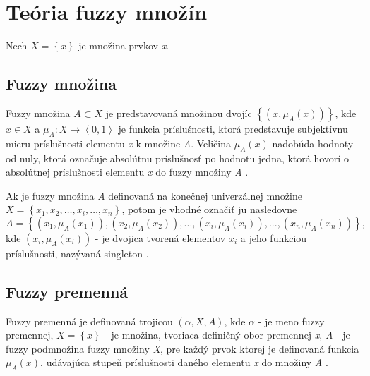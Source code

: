 
\section{Teória fuzzy množín}
Nech \textit{$ X = \left\lbrace x \right\rbrace$} je množina prvkov \textit{x}. 

\subsection*{Fuzzy množina}
\begin{defn} 
	
	Fuzzy množina \textit{$A \subset X $} je predstavovaná množinou dvojíc $ \left\lbrace \left( x, \mu_A \left( x \right) \right) \right\rbrace  $, kde $ x \in X$ a $ \mu_A : X \longrightarrow \left\langle 0, 1\right\rangle $ je funkcia príslušnosti, ktorá predstavuje subjektívnu mieru príslušnosti elementu \textit{x} k množine \textit{A}. 
	Veličina $\mu_A\left( x\right) $ nadobúda hodnoty od nuly, ktorá označuje absolútnu príslušnosť po hodnotu jedna, ktorá hovorí o absolútnej príslušnosti elementu \textit{x} do fuzzy množiny \textit{A} \cite{levashenkoProj, Zadeh1965}.\end{defn}

Ak je fuzzy množina \textit{A} definovaná na konečnej univerzálnej množine 
\\
$X = \left\lbrace x_1, x_2, \ldots , x_i, \ldots, x_n\right\rbrace $, potom je vhodné označiť ju nasledovne
$$
A = \left\lbrace 
\left( x_1, \mu_A\left( x_1\right)  \right) , 
\left( x_2, \mu_A\left( x_2\right)  \right) , ... , 
\left( x_i, \mu_A\left( x_i\right)  \right) , ... , 
\left( x_n, \mu_A\left( x_n\right)  \right) 
\right\rbrace , 
$$ 
kde $\left( x_i, \mu_A\left( x_i\right)  \right)$ - je dvojica tvorená elementov $x_i$ a jeho funkciou príslušnosti, nazývaná singleton \cite{levashenkoProj}. 





\subsection*{Fuzzy premenná}

\begin{defn}
Fuzzy premenná je definovaná trojicou $\left( \alpha, X, A \right) $, kde 
$\alpha $ - je meno fuzzy premennej, 
 $X=\left\lbrace x \right\rbrace$ - je množina, tvoriaca definičný obor premennej \textit{x}, 
 \textit{A} - je fuzzy podmnožina fuzzy množiny \textit{X}, pre každý prvok ktorej je definovaná funkcia $\mu_A\left( x\right)$, udávajúca stupeň príslušnosti daného elementu \textit{x} do množiny \textit{A}   \cite{levashenkoProj}.\end{defn}



